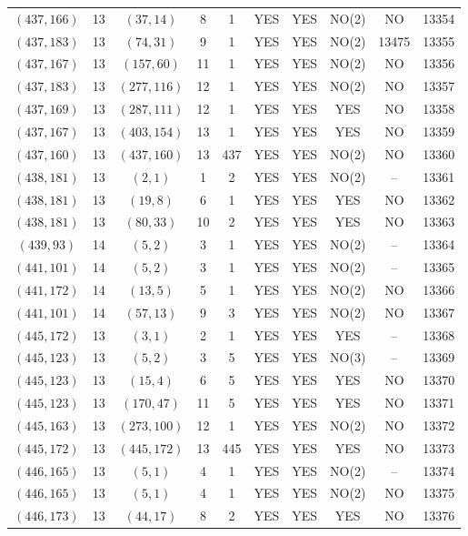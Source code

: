 \begin{longtable}{|c|c|c|c|c|c|c|c|c|c|}
$(437, 166)$ & 13 & $(37, 14)$ & 8 & 1 & YES & YES & NO(2) & NO & 13354\\
$(437, 183)$ & 13 & $(74, 31)$ & 9 & 1 & YES & YES & NO(2) & 13475 & 13355\\
$(437, 167)$ & 13 & $(157, 60)$ & 11 & 1 & YES & YES & NO(2) & NO & 13356\\
$(437, 183)$ & 13 & $(277, 116)$ & 12 & 1 & YES & YES & NO(2) & NO & 13357\\
$(437, 169)$ & 13 & $(287, 111)$ & 12 & 1 & YES & YES & YES & NO & 13358\\
$(437, 167)$ & 13 & $(403, 154)$ & 13 & 1 & YES & YES & YES & NO & 13359\\
$(437, 160)$ & 13 & $(437, 160)$ & 13 & 437 & YES & YES & NO(2) & NO & 13360\\
$(438, 181)$ & 13 & $(2, 1)$ & 1 & 2 & YES & YES & NO(2) & -- & 13361\\
$(438, 181)$ & 13 & $(19, 8)$ & 6 & 1 & YES & YES & YES & NO & 13362\\
$(438, 181)$ & 13 & $(80, 33)$ & 10 & 2 & YES & YES & YES & NO & 13363\\
$(439, 93)$ & 14 & $(5, 2)$ & 3 & 1 & YES & YES & NO(2) & -- & 13364\\
$(441, 101)$ & 14 & $(5, 2)$ & 3 & 1 & YES & YES & NO(2) & -- & 13365\\
$(441, 172)$ & 14 & $(13, 5)$ & 5 & 1 & YES & YES & NO(2) & NO & 13366\\
$(441, 101)$ & 14 & $(57, 13)$ & 9 & 3 & YES & YES & NO(2) & NO & 13367\\
$(445, 172)$ & 13 & $(3, 1)$ & 2 & 1 & YES & YES & YES & -- & 13368\\
$(445, 123)$ & 13 & $(5, 2)$ & 3 & 5 & YES & YES & NO(3) & -- & 13369\\
$(445, 123)$ & 13 & $(15, 4)$ & 6 & 5 & YES & YES & YES & NO & 13370\\
$(445, 123)$ & 13 & $(170, 47)$ & 11 & 5 & YES & YES & YES & NO & 13371\\
$(445, 163)$ & 13 & $(273, 100)$ & 12 & 1 & YES & YES & NO(2) & NO & 13372\\
$(445, 172)$ & 13 & $(445, 172)$ & 13 & 445 & YES & YES & YES & NO & 13373\\
$(446, 165)$ & 13 & $(5, 1)$ & 4 & 1 & YES & YES & NO(2) & -- & 13374\\
$(446, 165)$ & 13 & $(5, 1)$ & 4 & 1 & YES & YES & NO(2) & NO & 13375\\
$(446, 173)$ & 13 & $(44, 17)$ & 8 & 2 & YES & YES & YES & NO & 13376\\

\end{longtable}
